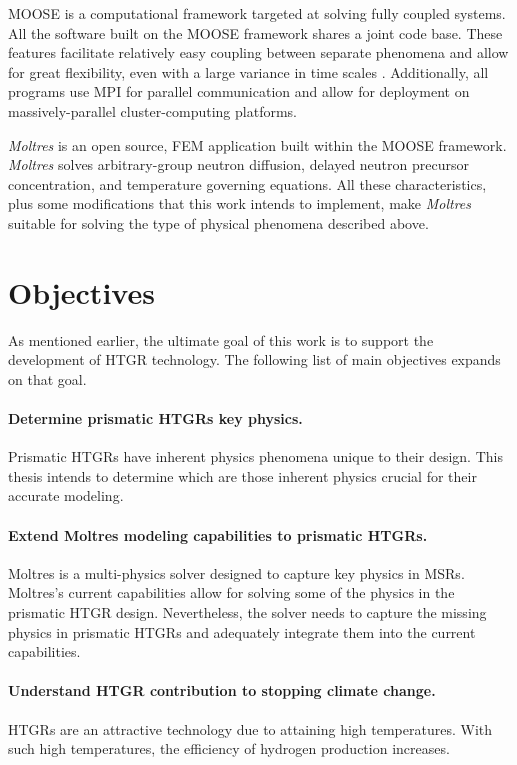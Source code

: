 \gls{MOOSE} \cite{gaston_moose_2009} is a computational framework targeted at solving fully coupled systems.
All the software built on the \gls{MOOSE} framework shares a joint code base.
These features facilitate relatively easy coupling between separate phenomena and allow for great flexibility, even with a large variance in time scales \cite{novak_pronghorn_2018}.
Additionally, all programs use \gls{MPI} for parallel communication and allow for deployment on massively-parallel cluster-computing platforms.

\textit{Moltres} is an open source, \gls{FEM} application built within the \gls{MOOSE} framework.
\textit{Moltres} solves arbitrary-group neutron diffusion, delayed neutron precursor concentration, and temperature governing equations.
All these characteristics, plus some modifications that this work intends to implement, make \textit{Moltres} suitable for solving the type of physical phenomena described above.

\section{Objectives}

As mentioned earlier, the ultimate goal of this work is to support the development of \gls{HTGR} technology.
The following list of main objectives expands on that goal.

\paragraph{Determine prismatic \glspl{HTGR} key physics.}
Prismatic HTGRs have inherent physics phenomena unique to their design.
This thesis intends to determine which are those inherent physics crucial for their accurate modeling.

\paragraph{Extend Moltres modeling capabilities to prismatic \glspl{HTGR}.}
Moltres is a multi-physics solver designed to capture key physics in \glspl{MSR}.
Moltres's current capabilities allow for solving some of the physics in the prismatic HTGR design.
Nevertheless, the solver needs to capture the missing physics in prismatic HTGRs and adequately integrate them into the current capabilities.

\paragraph{Understand \gls{HTGR} contribution to stopping climate change.}
HTGRs are an attractive technology due to attaining high temperatures.
With such high temperatures, the efficiency of hydrogen production increases.

